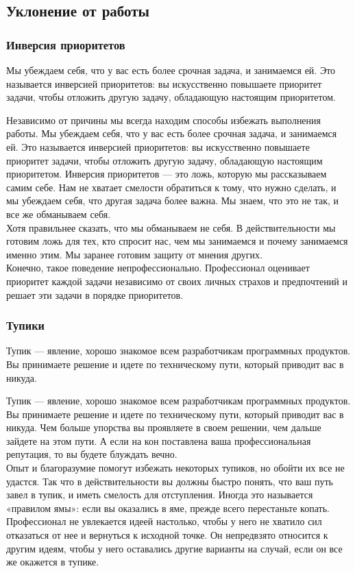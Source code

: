 \documentclass{../industrial-development}
\begin{document}
\subsection{Уклонение от работы}
\begin{frame} \frametitle{Инверсия приоритетов}
\begin{block}{}
Мы убеждаем себя, что у вас есть более срочная задача,
и занимаемся ей. Это называется инверсией приоритетов: вы искусственно повышаете приоритет задачи, чтобы отложить другую задачу,
обладающую настоящим приоритетом.
\end{block}
\end{frame}
\lecturenotes
Независимо от причины мы всегда находим способы избежать выполнения работы. Мы убеждаем себя, что у вас есть более срочная задача, и занимаемся ей. Это называется инверсией приоритетов: вы искусственно повышаете приоритет задачи, чтобы отложить другую задачу, обладающую настоящим приоритетом. Инверсия приоритетов — это ложь, которую мы рассказываем самим себе. Нам не хватает смелости обратиться к тому, что нужно сделать, и мы убеждаем себя, что другая задача более важна. Мы знаем, что это не так, и все же обманываем себя.\\
Хотя правильнее сказать, что мы обманываем не себя. В действительности мы готовим ложь для тех, кто спросит нас, чем мы занимаемся и почему занимаемся именно этим. Мы заранее готовим защиту от мнения других.\\
Конечно, такое поведение непрофессионально. Профессионал оценивает приоритет каждой задачи независимо от своих личных страхов и предпочтений и решает эти задачи в порядке приоритетов.

\begin{frame} \frametitle{Тупики}
\begin{block}{}
Тупик — явление, хорошо знакомое всем разработчикам программных
продуктов. Вы принимаете решение и идете по техническому пути,
который приводит вас в никуда. 
\end{block}
\end{frame}
\lecturenotes
Тупик — явление, хорошо знакомое всем разработчикам программных продуктов. Вы принимаете решение и идете по техническому пути, который приводит вас в никуда. Чем больше упорства вы проявляете в своем решении, чем дальше зайдете на этом пути. А если на кон поставлена ваша профессиональная репутация, то вы будете блуждать вечно.\\
Опыт и благоразумие помогут избежать некоторых тупиков, но обойти их все не удастся. Так что в действительности вы должны быстро понять, что ваш путь завел в тупик, и иметь смелость для отступления. Иногда это называется «правилом ямы»: если вы оказались в яме, прежде всего перестаньте копать.\\
Профессионал не увлекается идеей настолько, чтобы у него не хватило сил отказаться от нее и вернуться к исходной точке. Он непредвзято относится к другим идеям, чтобы у него оставались другие варианты на случай, если он все же окажется в тупике.
\end{document}
